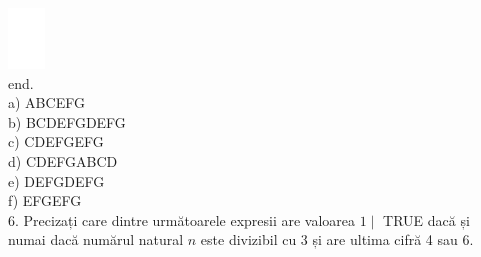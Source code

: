 \documentclass[10pt]{article}
\begin{document}
\includegraphics[max width=\textwidth, center]{2025_04_17_46e04c6acd873ea9558dg-219(1)}\\
end.\\
a) ABCEFG\\
b) BCDEFGDEFG\\
c) CDEFGEFG\\
d) CDEFGABCD\\
e) DEFGDEFG\\
f) EFGEFG\\
6. Precizați care dintre următoarele expresii are valoarea $1 \mid$ TRUE dacă și numai dacă numărul natural $n$ este divizibil cu 3 și are ultima cifră 4 sau 6.
\end{document}
